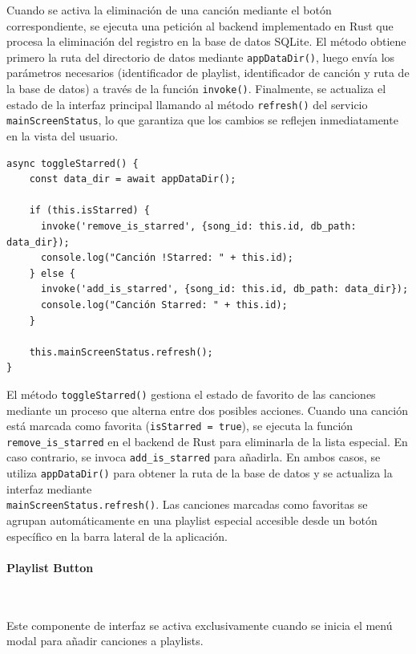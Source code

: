 \documentclass[11pt, a4paper]{article}
\begin{document}
                Cuando se activa la eliminación de una canción mediante el botón correspondiente, se ejecuta una petición al backend implementado en Rust que procesa la eliminación del registro en la base de datos SQLite. El método obtiene primero la ruta del directorio de datos mediante \verb|appDataDir()|, luego envía los parámetros necesarios (identificador de playlist, identificador de canción y ruta de la base de datos) a través de la función \verb|invoke()|. Finalmente, se actualiza el estado de la interfaz principal llamando al método \verb|refresh()| del servicio \verb|mainScreenStatus|, lo que garantiza que los cambios se reflejen inmediatamente en la vista del usuario.

                \begin{lstlisting}[caption={toggleStarred()}]
async toggleStarred() {
    const data_dir = await appDataDir();
    
    if (this.isStarred) {
      invoke('remove_is_starred', {song_id: this.id, db_path: data_dir});
      console.log("Canción !Starred: " + this.id);
    } else {
      invoke('add_is_starred', {song_id: this.id, db_path: data_dir});
      console.log("Canción Starred: " + this.id);
    }

    this.mainScreenStatus.refresh();
}
                \end{lstlisting}

                El método \verb|toggleStarred()| gestiona el estado de favorito de las canciones mediante un proceso que alterna entre dos posibles acciones. Cuando una canción está marcada como favorita (\verb|isStarred = true|), se ejecuta la función \verb|remove_is_starred| en el backend de Rust para eliminarla de la lista especial. En caso contrario, se invoca \verb|add_is_starred| para añadirla. En ambos casos, se utiliza \verb|appDataDir()| para obtener la ruta de la base de datos y se actualiza la interfaz mediante \\ \verb|mainScreenStatus.refresh()|. Las canciones marcadas como favoritas se agrupan automáticamente en una playlist especial accesible desde un botón específico en la barra lateral de la aplicación.

                \paragraph{Playlist Button}
                ‎

                Este componente de interfaz se activa exclusivamente cuando se inicia el menú modal para añadir canciones a playlists.
\end{document}
